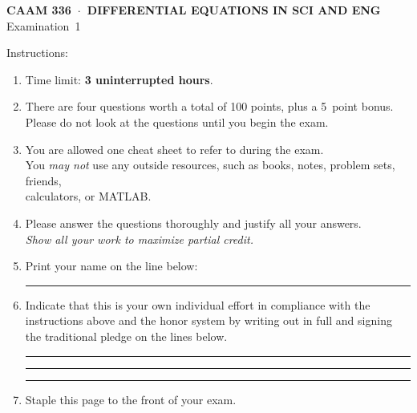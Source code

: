 \documentclass[11pt]{article}
\begin{document}
\thispagestyle{empty}
\vspace*{0em}
   \begin{center}
      \textsf{\textbf{CAAM 336\ $\cdot$\ DIFFERENTIAL EQUATIONS IN SCI AND ENG}}\\[0.5em]
       \textsf{Examination~1}
   \end{center}
   
\vspace*{3em}
Instructions:
\begin{enumerate}
\item Time limit: \textbf{3 uninterrupted hours}.
\item There are four questions worth a total of 100 points, 
        plus a 5~point bonus.\\
      Please do not look at the questions until you begin the exam.
\item You are allowed one cheat sheet to refer to during the exam. \\
You \emph{may not} use any outside resources, such as books, notes, problem sets, friends,\\
      calculators, or MATLAB. 
\item Please answer the questions thoroughly and justify all your answers.\\
      \emph{Show all your work to maximize partial credit.}

\item Print your name on the line below:

\vspace*{1em}\rule{6in}{0.5pt}

\item Indicate that this is your own individual effort in compliance with 
      the instructions above and the honor system by writing out in full 
      and signing the traditional pledge on the lines below.

\vspace*{1em}\rule{6in}{0.5pt}

\vspace*{1em}\rule{6in}{0.5pt}

\vspace*{1em}\rule{6in}{0.5pt}

\item Staple this page to the front of your exam.

\end{enumerate}
\end{document}
